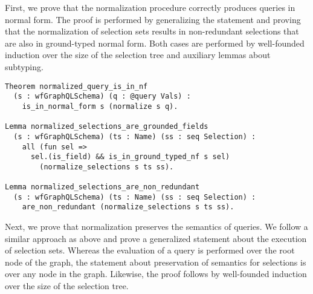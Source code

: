 First, we prove that the normalization procedure correctly produces queries in normal form. The proof is performed by generalizing the statement and proving that the normalization of selection sets results in non-redundant selections that are also in ground-typed normal form.
Both cases are performed by well-founded induction over the size of the selection tree and auxiliary lemmas about subtyping. 

\begin{verbatim}
Theorem normalized_query_is_in_nf 
  (s : wfGraphQLSchema) (q : @query Vals) :
    is_in_normal_form s (normalize s q).
    
Lemma normalized_selections_are_grounded_fields 
  (s : wfGraphQLSchema) (ts : Name) (ss : seq Selection) :
    all (fun sel => 
      sel.(is_field) && is_in_ground_typed_nf s sel)
        (normalize_selections s ts ss).
 
Lemma normalized_selections_are_non_redundant 
  (s : wfGraphQLSchema) (ts : Name) (ss : seq Selection) :
    are_non_redundant (normalize_selections s ts ss).
\end{verbatim}

Next, we prove that normalization preserves the semantics of queries. We follow a similar approach as above and prove a generalized statement about the execution of selection sets. Whereas the evaluation of a query is performed over the root node of the graph, the statement about preservation of semantics for selections is over any node in the graph. 
Likewise, the proof follows by well-founded induction over the size of the selection tree.


